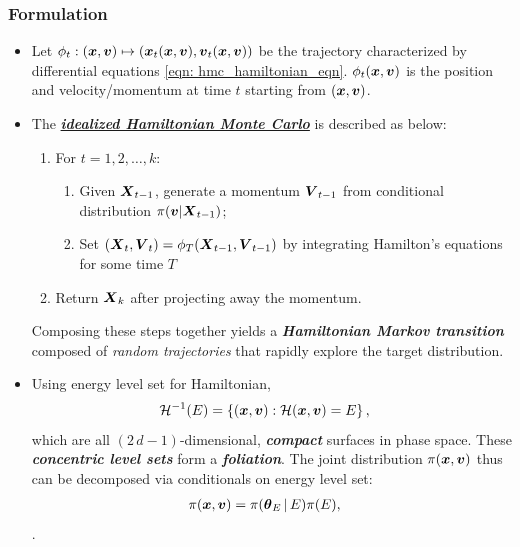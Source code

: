 \documentclass[11pt]{article}
\begin{document}
\subsubsection{Formulation}
\begin{itemize}
\item Let $\phi_t : (\boldsymbol{x}, \boldsymbol{v}) \mapsto (\boldsymbol{x}_t(\boldsymbol{x}, \boldsymbol{v}), \boldsymbol{v}_t(\boldsymbol{x}, \boldsymbol{v}))$ be the trajectory characterized by differential equations \eqref{eqn: hmc_hamiltonian_eqn}. $\phi_t(\boldsymbol{x}, \boldsymbol{v})$ is the position and velocity/momentum at time $t$ starting from $(\boldsymbol{x}, \boldsymbol{v})$. 

\item The \underline{\emph{\textbf{idealized Hamiltonian Monte Carlo}}} \citep{betancourt2017conceptual, vishnoi2021introduction} is described as below:

\begin{enumerate}
\item For $t=1,2,\ldots, k$:
\begin{enumerate}
\item Given $\boldsymbol{X}_{t-1}$, generate a momentum $\boldsymbol{V}_{t-1}$ from conditional distribution $\pi(\boldsymbol{v}|\boldsymbol{X}_{t-1})$;
\item Set $(\boldsymbol{X}_{t}, \boldsymbol{V}_{t}) = \phi_{T}(\boldsymbol{X}_{t-1}, \boldsymbol{V}_{t-1})$ by integrating Hamilton’s equations for some time $T$
\end{enumerate}

\item Return $\boldsymbol{X}_{k}$ after projecting away the momentum.
\end{enumerate}
Composing these steps together yields a \emph{\textbf{Hamiltonian Markov transition}} composed of \emph{random trajectories} that rapidly explore the target distribution.

\item Using energy level set for Hamiltonian, 
\begin{align*}
{\mathcal H}^{-1}(E) &= \left\{(\boldsymbol{x}, \boldsymbol{v}): {\mathcal H}(\boldsymbol{x}, \boldsymbol{v}) = E\right\},
\end{align*} which are all $(2\,d - 1)$-dimensional, \emph{\textbf{compact}} surfaces in phase space. These \emph{\textbf{concentric level sets}} form a \emph{\textbf{foliation}}. The joint distribution $\pi(\boldsymbol{x}, \boldsymbol{v})$ thus can be decomposed via conditionals on energy level set:
\begin{align*}
\pi(\boldsymbol{x}, \boldsymbol{v}) &= \pi(\boldsymbol{\theta}_{E}\,|\,E)\pi(E),
\end{align*}.


\end{itemize}
\end{document}
